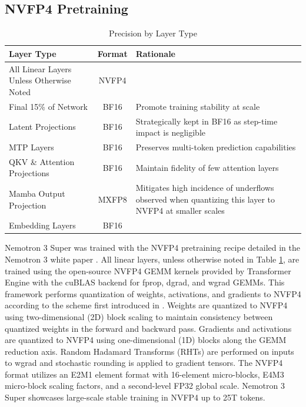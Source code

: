 \subsection{NVFP4 Pretraining}\label{sec:nvfp4}
\begin{table}[!hbt]\small\centering
\renewcommand{\arraystretch}{1.3}
\setlength{\tabcolsep}{10pt}
\caption{Precision by Layer Type}
\label{table:precision_by_layer}
\begin{tabular}{l|c|p{6cm}}
\toprule
\textbf{Layer Type} & \textbf{Format} & \textbf{Rationale}\\
\midrule
All Linear Layers Unless Otherwise Noted & NVFP4 &\\
\midrule
Final 15\% of Network & BF16 & Promote training stability at scale\\
\midrule
Latent Projections & BF16 & Strategically kept in BF16 as step-time impact is negligible\\ 
\midrule
MTP Layers & BF16 & Preserves multi-token prediction capabilities \\
\midrule
QKV \& Attention Projections & BF16 & Maintain fidelity of few attention layers\\
\midrule
Mamba Output Projection & MXFP8 & Mitigates high incidence of underflows observed when quantizing this layer to NVFP4 at smaller scales \\
\midrule
Embedding Layers & BF16 &\\ 
\bottomrule
\end{tabular}
\end{table}


Nemotron 3 Super was trained with the NVFP4 pretraining recipe detailed in the Nemotron 3 white paper \citep{nvidia2025nvidianemotron3efficient}. All linear layers, unless otherwise noted in Table \ref{table:precision_by_layer}, are trained using the open-source NVFP4 GEMM kernels provided by Transformer Engine with the cuBLAS backend \citep{NVIDIA_TransformerEngine_PR2177} for fprop, dgrad, and wgrad GEMMs. This framework performs quantization of weights, activations, and gradients to NVFP4 according to the scheme first introduced in \citet{nvidia2025pretraininglargelanguagemodels}. Weights are quantized to NVFP4 using two-dimensional (2D) block scaling to maintain consistency between quantized weights in the forward and backward pass. Gradients and activations are quantized to NVFP4 using one-dimensional (1D) blocks along the GEMM reduction axis. Random Hadamard Transforms (RHTs) are performed on inputs to wgrad and stochastic rounding is applied to gradient tensors. The NVFP4 format utilizes an E2M1 element format with 16-element micro-blocks, E4M3 micro-block scaling factors, and a second-level FP32 global scale. Nemotron 3 Super showcases large-scale stable training in NVFP4 up to 25T tokens.


